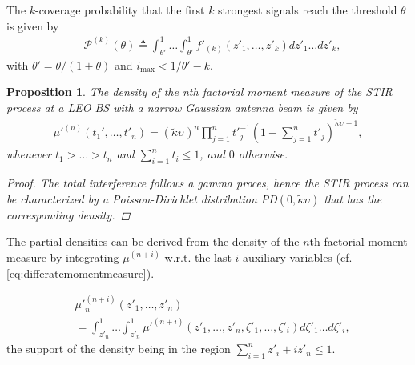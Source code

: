 \documentclass[lettersize,journal]{IEEEtran}
\newtheorem{prop}[theorem]{Proposition}
\begin{document}
The $k$-coverage probability that the first $k$ strongest signals reach the threshold $\theta$ is given by
\begin{align}
  \label{eq:kprobability}
  &\mathcal{P}^{(k)}(\theta) \triangleq  \int_{\theta'}^1\dots \int_{\theta'}^1 f'_{(k)}({z'_1},\dots,{z'_k})dz'_1 \dots d{z'_k}, 
\end{align}
with $\theta'=\theta/(1+\theta)$ and $i_{\text{max}}<1/\theta'-k$.


\label{sec:partialdensitySIR}


\begin{prop}
  The density of the n\textit{th} factorial moment measure of the STIR process at a LEO BS with a narrow Gaussian antenna beam is given by
  \begin{align}
    \label{eq:factorialmoment}
    \mu'^{(n)}(t_1',\dots,t'_n) = (\tilde{\kappa}\upsilon_{})^n\prod_{j=1}^n{t'}_{j}^{-1}\left(1- \sum_{j=1}^nt'_j \right)^{\tilde{\kappa}\upsilon_{}-1},       
  \end{align}
  whenever $t_1>\dots >t_n$ and $\sum_{i=1}^n t_i \leq 1$, and $0$ otherwise.
  \begin{proof}
    The total interference follows a gamma proces, hence the STIR process can be characterized by a Poisson-Dirichlet distribution PD$(0,\tilde{\kappa}\upsilon)$ that has the corresponding density.
  \end{proof}
\end{prop}

The partial densities can be derived from the density of the $n$th factorial moment measure by integrating $\mu^{(n+i)}$ w.r.t. the last $i$ auxiliary variables (cf. \eqref{eq:differatemomentmeasure}).

\begin{align}
  \label{eq:auxillary}
  &{\mu'}_n^{(n+i)}(z'_1,\dots,z'_n) \nonumber \\
  &= \int_{z'_n}^1 \dots \int_{z'_n}^1 {\mu'}^{(n+i)}(z'_1,\dots,z'_n,\zeta'_1,\dots,\zeta'_i) d\zeta'_1 \dots d\zeta'_i,
\end{align}
the support of the density being in the region $\sum_{i=1}^nz'_i+iz'_n \leq 1$. 
\end{document}
